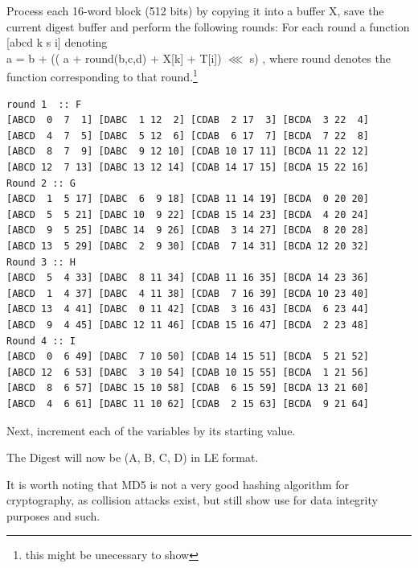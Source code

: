 \documentclass[11pt]{article}
\begin{document}
Process each 16-word block (512 bits) by copying it into a buffer X,
save the current digest buffer and perform the following rounds:
For each round a function [abcd k s i] denoting\\
a = b + (( a + round(b,c,d) + X[k] + T[i]) \(\lll\) s)
, where round denotes the function corresponding to that round.\footnote{this might be unecessary to show}
\begin{verbatim}
round 1  :: F
[ABCD  0  7  1] [DABC  1 12  2] [CDAB  2 17  3] [BCDA  3 22  4]
[ABCD  4  7  5] [DABC  5 12  6] [CDAB  6 17  7] [BCDA  7 22  8]
[ABCD  8  7  9] [DABC  9 12 10] [CDAB 10 17 11] [BCDA 11 22 12]
[ABCD 12  7 13] [DABC 13 12 14] [CDAB 14 17 15] [BCDA 15 22 16]
Round 2 :: G
[ABCD  1  5 17] [DABC  6  9 18] [CDAB 11 14 19] [BCDA  0 20 20]
[ABCD  5  5 21] [DABC 10  9 22] [CDAB 15 14 23] [BCDA  4 20 24]
[ABCD  9  5 25] [DABC 14  9 26] [CDAB  3 14 27] [BCDA  8 20 28]
[ABCD 13  5 29] [DABC  2  9 30] [CDAB  7 14 31] [BCDA 12 20 32]
Round 3 :: H
[ABCD  5  4 33] [DABC  8 11 34] [CDAB 11 16 35] [BCDA 14 23 36]
[ABCD  1  4 37] [DABC  4 11 38] [CDAB  7 16 39] [BCDA 10 23 40]
[ABCD 13  4 41] [DABC  0 11 42] [CDAB  3 16 43] [BCDA  6 23 44]
[ABCD  9  4 45] [DABC 12 11 46] [CDAB 15 16 47] [BCDA  2 23 48]
Round 4 :: I
[ABCD  0  6 49] [DABC  7 10 50] [CDAB 14 15 51] [BCDA  5 21 52]
[ABCD 12  6 53] [DABC  3 10 54] [CDAB 10 15 55] [BCDA  1 21 56]
[ABCD  8  6 57] [DABC 15 10 58] [CDAB  6 15 59] [BCDA 13 21 60]
[ABCD  4  6 61] [DABC 11 10 62] [CDAB  2 15 63] [BCDA  9 21 64]
\end{verbatim}
Next, increment each of the variables by its starting value.

The Digest will now be (A, B, C, D) in LE format.

It is worth noting that MD5 is not a very good hashing algorithm for cryptography, as collision attacks exist, but still show use for data integrity purposes and such.
\end{document}
